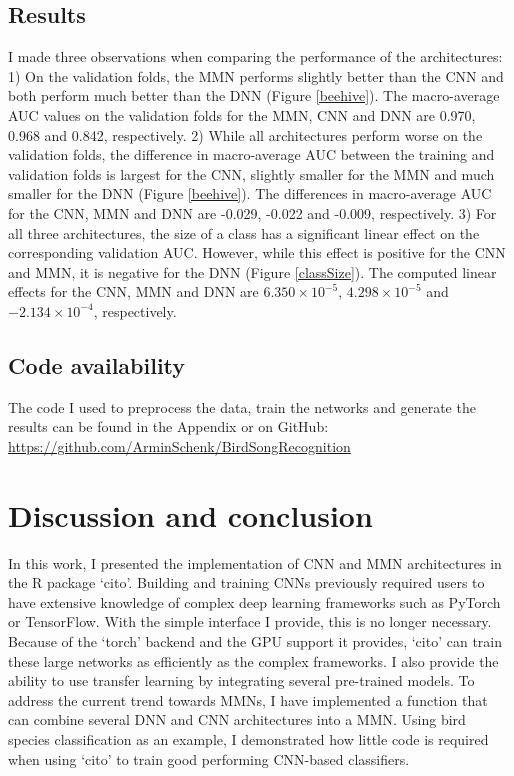 \documentclass[12pt,twoside]{scrreport}
\newcommand{\pkg}[1]{`#1'}
\begin{document}
\section*{Results}

I made three observations when comparing the performance of the architectures: 1) On the validation folds, the MMN performs slightly better than the CNN and both perform much better than the DNN (Figure \ref{beehive}). The macro-average AUC values on the validation folds for the MMN, CNN and DNN are 0.970, 0.968 and 0.842, respectively. 2) While all architectures perform worse on the validation folds, the difference in macro-average AUC between the training and validation folds is largest for the CNN, slightly smaller for the MMN and much smaller for the DNN (Figure \ref{beehive}). The differences in macro-average AUC for the CNN, MMN and DNN are -0.029, -0.022 and -0.009, respectively. 3) For all three architectures, the size of a class has a significant linear effect on the corresponding validation AUC. However, while this effect is positive for the CNN and MMN, it is negative for the DNN (Figure \ref{classSize}). The computed linear effects for the CNN, MMN and DNN are $6.350\times10^{-5}$, $4.298\times10^{-5}$ and $-2.134\times10^{-4}$, respectively.

\section*{Code availability}
The code I used to preprocess the data, train the networks and generate the results can be found in the Appendix or on GitHub: \url{https://github.com/ArminSchenk/BirdSongRecognition}

\chapter*{Discussion and conclusion}
In this work, I presented the implementation of CNN and MMN architectures in the R package \pkg{cito}. Building and training CNNs previously required users to have extensive knowledge of complex deep learning frameworks such as PyTorch or TensorFlow. With the simple interface I provide, this is no longer necessary. Because of the \pkg{torch} backend and the GPU support it provides, \pkg{cito} can train these large networks as efficiently as the complex frameworks. I also provide the ability to use transfer learning by integrating several pre-trained models. To address the current trend towards MMNs, I have implemented a function that can combine several DNN and CNN architectures into a MMN. Using bird species classification as an example, I demonstrated how little code is required when using \pkg{cito} to train good performing CNN-based classifiers.
\end{document}
